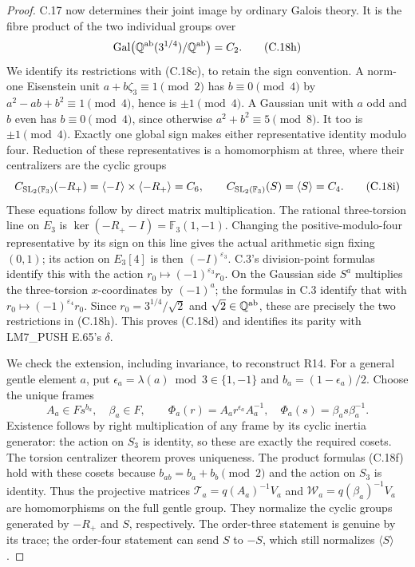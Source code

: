 \begin{proof}
C.17 now determines their joint image by ordinary
Galois theory. It is the fibre product of the two
individual groups over
\[
 \operatorname{Gal}\bigl(
  \mathbb Q^{\rm ab}(3^{1/4})/\mathbb Q^{\rm ab}\bigr)=C_2.
 \tag{C.18h}
\]
We identify its restrictions with (C.18c), to retain
the sign convention. A norm-one Eisenstein unit
\(a+b\zeta_3\equiv1\pmod2\) has \(b\equiv0\pmod4\)
by \(a^2-ab+b^2\equiv1\pmod4\), hence is
\(\pm1\pmod4\). A Gaussian unit with \(a\) odd and
\(b\) even has \(b\equiv0\pmod4\), since otherwise
\(a^2+b^2\equiv5\pmod8\). It too is \(\pm1\pmod4\).
Exactly one global sign makes either representative
identity modulo four. Reduction of these representatives
is a homomorphism at three, where their centralizers
are the cyclic groups
\[
 C_{{\rm SL}_2(\mathbb F_3)}(-R_+)
       =\langle-I\rangle\times\langle-R_+\rangle=C_6,
 \qquad C_{{\rm SL}_2(\mathbb F_3)}(S)=\langle S\rangle=C_4.
 \tag{C.18i}
\]
These equations follow by direct matrix multiplication.
The rational three-torsion line on \(E_3\) is
\(\ker(-R_+-I)=\mathbb F_3(1,-1)\).
Changing the positive-modulo-four representative by
its sign on this line gives the actual arithmetic
sign fixing \((0,1)\); its action on \(E_3[4]\) is
then \((-I)^{\varepsilon_3}\). C.3's division-point
formulas identify this with the action
\(r_0\mapsto(-1)^{\varepsilon_3}r_0\).
On the Gaussian side \(S^a\) multiplies the
three-torsion \(x\)-coordinates by \((-1)^a\);
the formulas in C.3 identify that with
\(r_0\mapsto(-1)^{\varepsilon_4}r_0\).
Since \(r_0=3^{1/4}/\sqrt2\) and \(\sqrt2\in\mathbb Q^{\rm ab}\),
these are precisely the two restrictions in (C.18h).
This proves (C.18d) and identifies its parity with
LM7\_PUSH E.65's \(\delta\).

We check the extension, including invariance, to
reconstruct R14. For a general gentle element \(a\),
put \(\epsilon_a=\lambda(a)\bmod3\in\{1,-1\}\) and
\(b_a=(1-\epsilon_a)/2\). Choose the unique frames
\[
 A_a\in Fs^{b_a},\quad\beta_a\in F,\qquad
 \Phi_a(r)=A_a r^{\epsilon_a}A_a^{-1},\quad
 \Phi_a(s)=\beta_a s\beta_a^{-1}.
 \tag{C.18l}
\]
Existence follows by right multiplication of any frame
by its cyclic inertia generator: the action on
\(S_3\) is identity, so these are exactly the required
cosets. The torsion centralizer theorem proves uniqueness.
The product formulas (C.18f) hold with these cosets
because \(b_{ab}=b_a+b_b\pmod2\) and the action on
\(S_3\) is identity. Thus the projective matrices
\(\mathcal T_a=q(A_a)^{-1}V_a\) and
\(\mathcal W_a=q(\beta_a)^{-1}V_a\) are homomorphisms
on the full gentle group. They normalize the cyclic
groups generated by \(-R_+\) and \(S\), respectively.
The order-three statement is genuine by its trace;
the order-four statement can send \(S\) to \(-S\),
which still normalizes \(\langle S\rangle\).


\end{proof}
